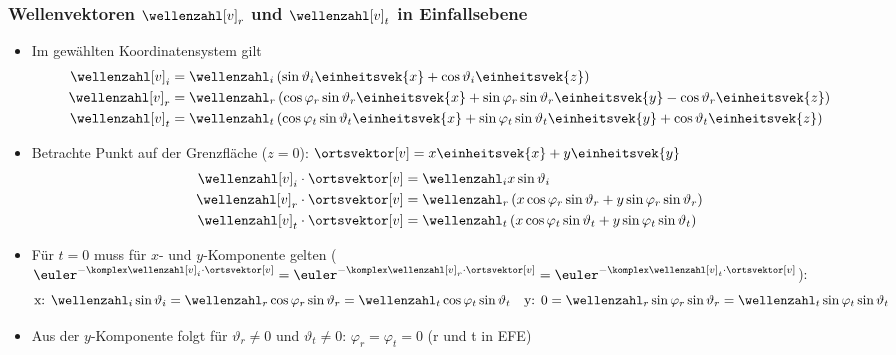 \begin{frame}
  \frametitle{Wellenvektoren \(\wellenzahl[v]_r\) und \(\wellenzahl[v]_t\) in Einfallsebene}
  \begin{itemize}[<+->]
  \item Im gewählten Koordinatensystem gilt
    \begin{align*}
      \wellenzahl[v]_i &= \wellenzahl_i \left( \sin\vartheta_i\einheitsvek{x} + \cos\vartheta_i\einheitsvek{z} \right)\\
      \wellenzahl[v]_r &= \wellenzahl_r \left( \cos\varphi_r\sin\vartheta_r\einheitsvek{x} + \sin\varphi_r\sin\vartheta_r\einheitsvek{y}  - \cos\vartheta_r\einheitsvek{z}\right) \\
      \wellenzahl[v]_t &= \wellenzahl_t \left( \cos\varphi_t\sin\vartheta_t\einheitsvek{x} + \sin\varphi_t\sin\vartheta_t\einheitsvek{y}  + \cos\vartheta_t\einheitsvek{z}\right) 
    \end{align*}
    \item Betrachte Punkt auf der Grenzfläche (\(z=0\)): \(\ortsvektor[v] = x\einheitsvek{x} + y\einheitsvek{y} \)
    \begin{align*}
      \wellenzahl[v]_i\cdot\ortsvektor[v] &= \wellenzahl_i x\sin\vartheta_i \\
      \wellenzahl[v]_r \cdot\ortsvektor[v]&= \wellenzahl_r \left( x\cos\varphi_r\sin\vartheta_r + y\sin\varphi_r\sin\vartheta_r \right) \\
      \wellenzahl[v]_t \cdot\ortsvektor[v]&= \wellenzahl_t \left( x\cos\varphi_t\sin\vartheta_t + y\sin\varphi_t\sin\vartheta_t \right) 
    \end{align*}
  \item Für \(t=0\) muss für \(x\)- und \(y\)-Komponente gelten (\(\euler^{-\komplex\wellenzahl[v]_i\cdot\ortsvektor[v]} = \euler^{-\komplex\wellenzahl[v]_r\cdot\ortsvektor[v]} = \euler^{-\komplex\wellenzahl[v]_t\cdot\ortsvektor[v]}\)):
    \begin{equation*}
      \text{x: }\wellenzahl_i\sin\vartheta_i = \wellenzahl_r\cos\varphi_r\sin\vartheta_r =\wellenzahl_t\cos\varphi_t\sin\vartheta_t \quad \text{y: }0=\wellenzahl_r\sin\varphi_r\sin\vartheta_r = \wellenzahl_t\sin\varphi_t\sin\vartheta_t
    \end{equation*}
  \item Aus der \(y\)-Komponente folgt für \(\vartheta_r\ne 0\) und \(\vartheta_t\ne 0\): \(\boxed{\varphi_r=\varphi_t=0}\) (\alert{r und t in EFE})
  \end{itemize}
\end{frame}

